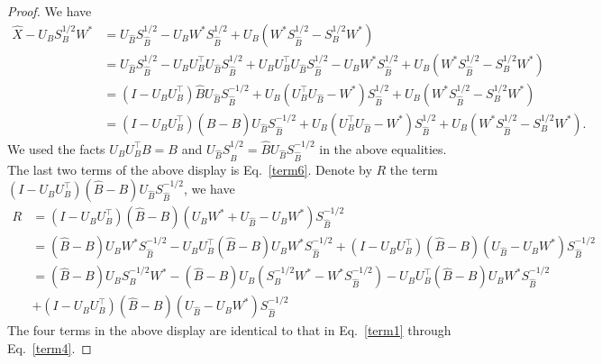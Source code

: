 \begin{proof}
We have 
        \begin{align*}
          \hat{X} - U_B S_B^{1/2} W^*  
          & = U_{\hat{B}} S_{\hat{B}}^{1/2} - U_B W^* S_{\hat{B}}^{1/2} + U_B (W^* S_{\hat{B}}^{1/2} - S_{B}^{1/2} W^*) \\
          & = U_{\hat{B}} S_{\hat{B}}^{1/2} - U_B U_B^{\top} U_{\hat{B}} S_{\hat{B}}^{1/2} + U_B U_B^{\top} U_{\hat{B}} S_{\hat{B}}^{1/2} - U_B W^* S_{\hat{B}}^{1/2} + U_B (W^* S_{\hat{B}}^{1/2} - S_{B}^{1/2} W^*) \\
          & = (I - U_B U_B^{\top}) \hat{B} U_{\hat{B}} S_{\hat{B}}^{-1/2} + U_B (U_B^{\top} U_{\hat{B}} - W^{*}) S_{\hat{B}}^{1/2} + U_B (W^* S_{\hat{B}}^{1/2} - S_{B}^{1/2} W^*) \\
          &= (I - U_B U_B^{\top}) (\hat{B} - B) U_{\hat{B}} S_{\hat{B}}^{-1/2} + U_B (U_B^{\top} U_{\hat{B}} - W^*) S_{\hat{B}}^{1/2} + U_B (W^* S_{\hat{B}}^{1/2} - S_{B}^{1/2} W^*). 
        \end{align*}
        We used the facts $ U_B U_B^\top B = B$ and $U_{\hat{B}} S_{\hat{B}}^{1/2} = \hat{B} U_{\hat{B}} S_{\hat{B}}^{-1/2}$ in the above equalities. The last two terms of the above display is Eq.~\eqref{term6}. Denote by $R$ the term  
        $(I - U_B U_B^{\top}) (\hat{B} - B) U_{\hat{B}} S_{\hat{B}}^{-1/2}$, we have
        \begin{equation*}
        \begin{split}
        R & 
            =  (I - U_B U_B^{\top}) (\hat{B} - B) ( U_BW^* + U_{\hat{B}} - U_{B} W^{*}) S_{\hat{B}}^{-1/2}   \\
          & = (\hat{B} -B) U_B W^* S_{\hat{B}}^{-1/2} - U_B U_B^{\top} (\hat{B} - B) U_B W^* S_{\hat{B}}^{-1/2} + (I - U_B U_B^{\top}) (\hat{B} - B) (U_{\hat{B}} - U_{B} W^{*}) S_{\hat{B}}^{-1/2} 
          \\
          & = ( \hat{B} - B) U_B S_B^{-1/2} W^{*} 
           - (\hat{B} - B) U_B (S_{B}^{-1/2} W^{*} - W^{*} S_{\hat{B}}^{-1/2}) 
           - U_B U_B^{\top} (\hat{B} - B) U_B W^* S_{\hat{B}}^{-1/2} \\
           & + (I - U_B U_B^{\top}) (\hat{B} - B) (U_{\hat{B}} - U_{B} W^{*})S_{\hat{B}}^{-1/2}
           \end{split}
        \end{equation*}
        The four terms in the above display are identical to that in Eq.~\eqref{term1} through Eq.~\eqref{term4}.
\end{proof}


